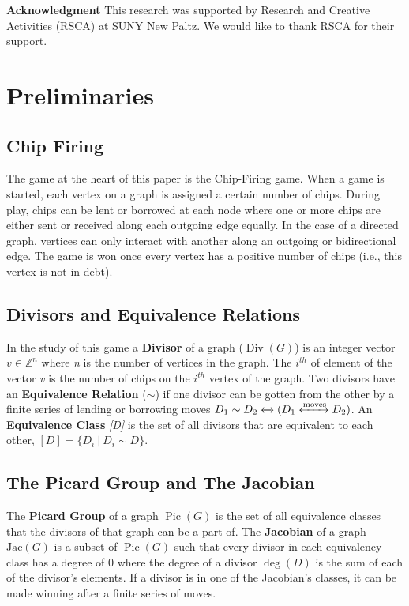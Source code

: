 \documentclass[11pt,reqno]{amsart}
\DeclareMathOperator{\Pic}{Pic}
\DeclareMathOperator{\Div}{Div}
\DeclareMathOperator{\Deg}{deg}
\newcommand{\Jac}{\textrm{Jac}}{}
\theoremstyle{definition}
\theoremstyle{plain}
\begin{document}
\bigskip

\textbf{Acknowledgment}\hspace{0.1cm} This research was supported by Research and Creative Activities (RSCA) at
	SUNY New Paltz. We would like to thank RSCA for their support.

\section{Preliminaries}
	\subsection{Chip Firing}
		The game at the heart of this paper is the Chip-Firing game. When a game is started, each vertex on
		a graph is assigned a certain number of chips.  During play, chips can be lent or borrowed at each
		node where one or more chips are either sent or received along each outgoing edge equally.  In the
		case of a directed graph, vertices can only interact with another along an outgoing or
		bidirectional edge.  The game is won once every vertex has a positive number of chips (i.e., this
		vertex is not in debt).

	\subsection{Divisors and Equivalence Relations}
		In the study of this game a \textbf{Divisor} of a graph ($\Div(G)$) is an integer vector $v\in\mathbb{Z}^n$
		where \textit{n} is the number of vertices in the graph.  The $i^{th}$ of element of the vector \textit{v}
		is the number of chips on the $i^{th}$ vertex of the graph.  Two divisors have an \textbf{Equivalence Relation}
		($\sim$) if one divisor can be gotten from the other by a finite series of lending or borrowing moves
		$D_1 \sim D_2 \xleftrightarrow{} (D_1 \xleftrightarrow{\text{moves}} D_2)$.  An \textbf{Equivalence Class} \textit{[D]}
		is the set of all divisors that are equivalent to each other, $[D] = \{D_i~|~D_i \sim D\}$.

	\subsection{The Picard Group and The Jacobian}
		The \textbf{Picard Group} of a graph $\Pic(G)$ is the set of all equivalence classes that the divisors of that graph can be a
		part of. The \textbf{Jacobian} of a graph  $\Jac(G)$ is a subset of $\Pic(G)$ such that every divisor in each
		equivalency class has a degree of $0$ where the degree of a divisor $\Deg(D)$ is the sum of each of the divisor's elements.
		If a divisor is in one of the Jacobian's classes, it can be made winning after a finite series of moves.
\end{document}

